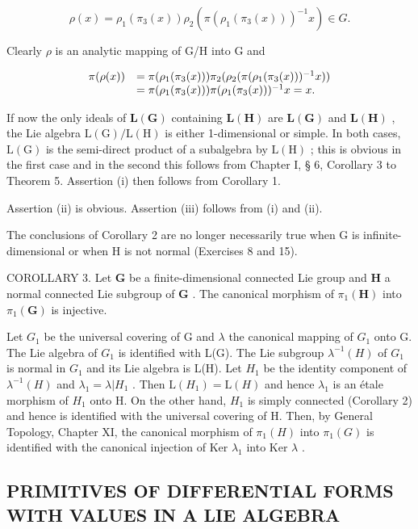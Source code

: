 \[
\rho (x) = \rho_ {1} (\pi_ {3} (x)) \rho_ {2} (\pi (\rho_ {1} (\pi_ {3} (x))) ^ {- 1} x) \in G.
\]

Clearly \(\rho\) is an analytic mapping of G/H into G and

\[
\begin{array}{r l} \pi (\rho (x)) & = \pi (\rho_ {1} (\pi_ {3} (x))) \pi_ {2} (\rho_ {2} (\pi (\rho_ {1} (\pi_ {3} (x))) ^ {- 1} x)) \\ & = \pi (\rho_ {1} (\pi_ {3} (x))) \pi (\rho_ {1} (\pi_ {3} (x))) ^ {- 1} x = x. \end{array}
\]

If now the only ideals of \(\mathbf{L}(\mathbf{G})\) containing \(\mathbf{L}(\mathbf{H})\) are \(\mathbf{L}(\mathbf{G})\) and \(\mathbf{L}(\mathbf{H})\) , the Lie algebra \(\mathrm{L(G) / L(H)}\) is either 1-dimensional or simple. In both cases, \(\mathrm{L(G)}\) is the semi-direct product of a subalgebra by \(\mathrm{L(H)}\) ; this is obvious in the first case and in the second this follows from Chapter I, § 6, Corollary 3 to Theorem 5. Assertion (i) then follows from Corollary 1.

Assertion (ii) is obvious. Assertion (iii) follows from (i) and (ii).

The conclusions of Corollary 2 are no longer necessarily true when G is infinite-dimensional or when H is not normal (Exercises 8 and 15).

COROLLARY 3. Let \(\mathbf{G}\) be a finite-dimensional connected Lie group and \(\mathbf{H}\) a normal connected Lie subgroup of \(\mathbf{G}\) . The canonical morphism of \(\pi_1(\mathbf{H})\) into \(\pi_1(\mathbf{G})\) is injective.

Let \(G_{1}\) be the universal covering of G and \(\lambda\) the canonical mapping of \(G_{1}\) onto G. The Lie algebra of \(G_{1}\) is identified with L(G). The Lie subgroup \(\lambda^{-1}(H)\) of \(G_{1}\) is normal in \(G_{1}\) and its Lie algebra is L(H). Let \(H_{1}\) be the identity component of \(\lambda^{-1}(H)\) and \(\lambda_{1} = \lambda | H_{1}\) . Then \(\mathrm{L}(H_{1}) = \mathrm{L}(H)\) and hence \(\lambda_{1}\) is an étale morphism of \(H_{1}\) onto H. On the other hand, \(H_{1}\) is simply connected (Corollary 2) and hence is identified with the universal covering of H. Then, by General Topology, Chapter XI, the canonical morphism of \(\pi_{1}(H)\) into \(\pi_{1}(G)\) is identified with the canonical injection of Ker \(\lambda_{1}\) into Ker \(\lambda\) .

\subsection{PRIMITIVES OF DIFFERENTIAL FORMS WITH VALUES IN A LIE ALGEBRA}

